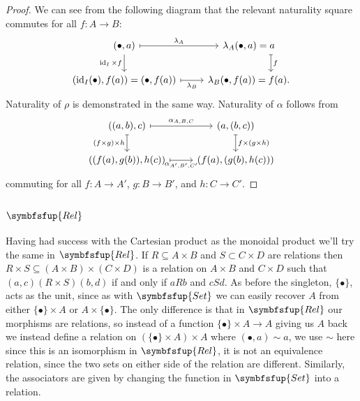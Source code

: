 \documentclass[fleqn]{NotesClass}
\makeatletter
\newcommand{\c@egory}[1]{\symbfsfup{#1}}
\newcommand{\Set}{\c@egory{Set}}
\newcommand{\Rel}{\c@egory{Rel}}
\DeclareMathOperator{\id}{id}
\makeatother
\begin{document}
\begin{lma}{}{}
\begin{proof}
            We can see from the following diagram that the relevant naturality square commutes for all \(f \colon A \to B\):
            \begin{equation}
                \begin{tikzcd}
                    (\bullet, a) \arrow[r, mapsto, "\lambda_A"] \arrow[d, "\id_I \times f"'] & \lambda_A(\bullet, a) = a \arrow[d, mapsto, "f", shift left=0.8cm]\\
                    (\id_I(\bullet), f(a)) = (\bullet, f(a)) \arrow[r, mapsto, "\lambda_B"'] & \lambda_B(\bullet, f(a)) = f(a).
                \end{tikzcd}
            \end{equation}
            Naturality of \(\rho\) is demonstrated in the same way.
            Naturality of \(\alpha\) follows from
            \begin{equation}
                \begin{tikzcd}
                    ((a, b), c) \arrow[r, mapsto, "\alpha_{A,B,C}"] \arrow[d, mapsto, "(f\times g)\times h"'] & (a, (b, c)) \arrow[d, mapsto, "f\times(g\times h)"]\\
                    ((f(a), g(b)), h(c)) \arrow[r, mapsto, "\alpha_{A',B',C'}"'] & (f(a), (g(b), h(c)))
                \end{tikzcd}
            \end{equation}
            commuting for all \(f \colon A \to A'\), \(g \colon B \to B'\), and \(h \colon C \to C'\).
        \end{proof}
    \end{lma}
    
    \subsection{\texorpdfstring{\(\Rel\)}{Rel}}
    Having had success with the Cartesian product as the monoidal product we'll try the same in \(\Rel\).
    If \(R \subseteq A \times B\) and \(S \subset C \times D\) are relations then \(R \times S \subseteq (A \times B) \times (C \times D)\) is a relation on \(A \times B\) and \(C \times D\) such that \((a, c)(R \times S)(b, d)\) if and only if \(a R b\) and \(c S d\).
    As before the singleton, \(\{\bullet\}\), acts as the unit, since as with \(\Set\) we can easily recover \(A\) from either \(\{\bullet\} \times A\) or \(A \times \{\bullet\}\).
    The only difference is that in \(\Rel\) our morphisms are relations, so instead of a function \(\{\bullet\} \times A \to A\) giving us \(A\) back we instead define a relation on \((\{\bullet\} \times A) \times A\) where \((\bullet, a) \sim a\), we use \(\sim\) here since this is an isomorphism in \(\Rel\), it is not an equivalence relation, since the two sets on either side of the relation are different.
    Similarly, the associators are given by changing the function in \(\Set\) into a relation.
    
\end{document}
